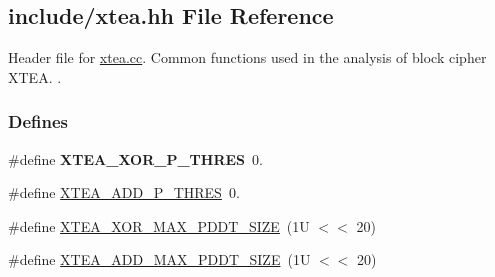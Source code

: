 \hypertarget{xtea_8hh}{\subsection{include/xtea.hh \-File \-Reference}
\label{xtea_8hh}
}


\-Header file for \hyperlink{xtea_8cc}{xtea.\-cc}. \-Common functions used in the analysis of block cipher \-X\-T\-E\-A. .  


\subsubsection*{\-Defines}
\begin{DoxyCompactItemize}
\item 
\hypertarget{xtea_8hh_a339bdee60659f339f26292f8c37be29b}{\#define {\bfseries \-X\-T\-E\-A\-\_\-\-X\-O\-R\-\_\-\-P\-\_\-\-T\-H\-R\-E\-S}~0.}\label{xtea_8hh_a339bdee60659f339f26292f8c37be29b}

\item 
\#define \hyperlink{xtea_8hh_a33552d767f63f3e835002cbd0bfe52c4}{\-X\-T\-E\-A\-\_\-\-A\-D\-D\-\_\-\-P\-\_\-\-T\-H\-R\-E\-S}~0.
\item 
\#define \hyperlink{xtea_8hh_afe64f79ecc93e545a7e0a99ee37bf789}{\-X\-T\-E\-A\-\_\-\-X\-O\-R\-\_\-\-M\-A\-X\-\_\-\-P\-D\-D\-T\-\_\-\-S\-I\-Z\-E}~(1\-U $<$$<$ 20)
\item 
\#define \hyperlink{xtea_8hh_aa79d9e849b88bc759ddf5bef97ed7830}{\-X\-T\-E\-A\-\_\-\-A\-D\-D\-\_\-\-M\-A\-X\-\_\-\-P\-D\-D\-T\-\_\-\-S\-I\-Z\-E}~(1\-U $<$$<$ 20)
\end{DoxyCompactItemize}
